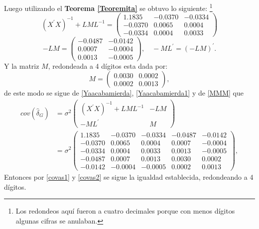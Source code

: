\documentclass[10.5pt,notitlepage]{article}
\theoremstyle{plain}
\begin{document}
Luego utilizando el \textbf{Teorema \ref{Teoremita}} se obtuvo lo siguiente: \footnote{Los redondeos aquí fueron a cuatro decimales porque con menos dígitos algunas cifras se anulaban.}
\begin{equation}\label{Yaacabamierda}
    (X^{'}X)^{-1} + LML^{-1} = \begin{pmatrix}
  1.1835&  -0.0370& -0.0334\\
 -0.0370&   0.0065&  0.0004\\
 -0.0334&   0.0004&  0.0033
\end{pmatrix}\end{equation}
\begin{equation}\label{Yaacabamierda1}
 -LM = \begin{pmatrix}
 -0.0487&  -0.0142\\
  0.0007&  -0.0004\\
  0.0013&  -0.0005
    \end{pmatrix},\quad -ML^{'} = (-LM)^{'}. 
\end{equation}
Y la matriz \(M\), redondeada a 4 dígitos esta dada por:
\begin{equation}\label{MMM}
M = \begin{pmatrix}
 0.0030&  0.0002\\ 
 0.0002&  0.0013
\end{pmatrix},  
\end{equation}
de este modo se sigue de \eqref{Yaacabamierda}, \eqref{Yaacabamierda1} y de \eqref{MMM} que
\begin{align}\label{covas2}
    cov(\hat{\delta}_{G})&=\sigma^2\begin{pmatrix}(X^{'}X)^{-1} + LML^{-1}&-LM\\ -ML^{'} & M \end{pmatrix}\nonumber\\
    &= \sigma^2\begin{pmatrix}
  1.1835&  -0.0370 &  -0.0334&  -0.0487&  -0.0142\\
 -0.0370&    0.0065&   0.0004&   0.0007&  -0.0004\\
 -0.0334&   0.0004&   0.0033&   0.0013&  -0.0005\\
 -0.0487&   0.0007&   0.0013&   0.0030&    0.0002\\
 -0.0142&  -0.0004&  -0.0005&   0.0002&   0.0013
\end{pmatrix},
\end{align}
Entonces por \eqref{covas1} y \eqref{covas2} se sigue la igualdad establecida, redondeando a 4 dígitos.
\end{document}
